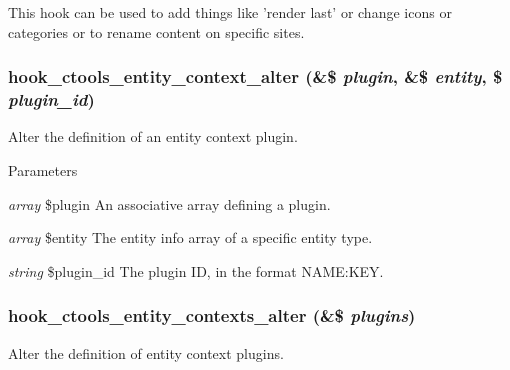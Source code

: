 This hook can be used to add things like 'render last' or change icons or categories or to rename content on specific sites. \hypertarget{group__hooks_gad8e0232b98d84d2347a3cc1e26c3df09}{
\subsubsection[{hook\_\-ctools\_\-entity\_\-context\_\-alter}]{\setlength{\rightskip}{0pt plus 5cm}hook\_\-ctools\_\-entity\_\-context\_\-alter (\&\$ {\em plugin}, \/  \&\$ {\em entity}, \/  \$ {\em plugin\_\-id})}}
\label{group__hooks_gad8e0232b98d84d2347a3cc1e26c3df09}
Alter the definition of an entity context plugin.


\begin{DoxyParams}{Parameters}
\item[{\em array}]\$plugin An associative array defining a plugin. \item[{\em array}]\$entity The entity info array of a specific entity type. \item[{\em string}]\$plugin\_\-id The plugin ID, in the format NAME:KEY. \end{DoxyParams}
\hypertarget{group__hooks_gadc7f17dbf80ddbe90f66e7e9a0abb350}{
\subsubsection[{hook\_\-ctools\_\-entity\_\-contexts\_\-alter}]{\setlength{\rightskip}{0pt plus 5cm}hook\_\-ctools\_\-entity\_\-contexts\_\-alter (\&\$ {\em plugins})}}
\label{group__hooks_gadc7f17dbf80ddbe90f66e7e9a0abb350}
Alter the definition of entity context plugins.


